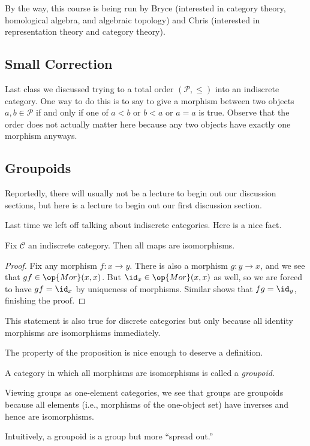
By the way, this course is being run by Bryce (interested in category theory, homological algebra, and algebraic topology) and Chris (interested in representation theory and category theory).

\subsection{Small Correction}
Last class we discussed trying to a total order $(\mathcal P,\le)$ into an indiscrete category. One way to do this is to say to give a morphism between two objects $a,b\in\mathcal P$ if and only if one of $a<b$ or $b<a$ or $a=a$ is true. Observe that the order does not actually matter here because any two objects have exactly one morphism anyways.

\subsection{Groupoids}
Reportedly, there will usually not be a lecture to begin out our discussion sections, but here is a lecture to begin out our first discussion section.

Last time we left off talking about indiscrete categories. Here is a nice fact.
\begin{proposition}
	Fix $\mathcal C$ an indiscrete category. Then all maps are isomorphisms.
\end{proposition}
\begin{proof}
	Fix any morphism $f:x\to y$. There is also a morphism $g:y\to x$, and we see that $gf\in\op{Mor}(x,x)$. But $\id_x\in\op{Mor}(x,x)$ as well, so we are forced to have $gf=\id_x$ by uniqueness of morphisms. Similar shows that $fg=\id_y$, finishing the proof.
\end{proof}
\begin{remark}
	This statement is also true for discrete categories but only because all identity morphisms are isomorphisms immediately.
\end{remark}
The property of the proposition is nice enough to deserve a definition.
\begin{definition}[Groupoid]
	A category in which all morphisms are isomorphisms is called a \textit{groupoid}.
\end{definition}
\begin{example}
	Viewing groups as one-element categories, we see that groups are groupoids because all elements (i.e., morphisms of the one-object set) have inverses and hence are isomorphisms.
\end{example}
Intuitively, a groupoid is a group but more ``spread out.''

